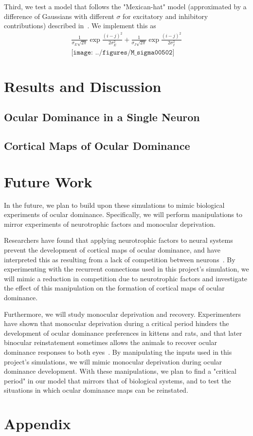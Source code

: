 \documentclass[pageno]{mat323paper}
\begin{document}
Third, we test a model that follows the "Mexican-hat" model (approximated by a difference of Gaussians with different $\sigma$ for excitatory and inhibitory contributions) described in~\cite{toyoizumi_equalization_2009}. We implement this as 
\begin{align}
\frac{1}{\sigma_E\sqrt{2\pi}}\exp{\frac{(i-j)^2}{2\sigma_E^2}}+\frac{1}{\sigma_I\sqrt{2\pi}}\exp{\frac{(i-j)^2}{2\sigma_I^2}}\\
\texttt{[image: ../figures/M\_sigma00502]}
\end{align}

\section{Results and Discussion}
\subsection{Ocular Dominance in a Single Neuron}
\subsection{Cortical Maps of Ocular Dominance}

\section{Future Work}
In the future, we plan to build upon these simulations to mimic biological experiments of ocular dominance. Specifically, we will perform manipulations to mirror experiments of neurotrophic factors and monocular deprivation.

Researchers have found that applying neurotrophic factors to neural systems prevent the development of cortical maps of ocular dominance, and have interpreted this as resulting from a lack of competition between neurons~\cite{harris_model_1997}. By experimenting with the recurrent connections used in this project's simulation, we will mimic a reduction in competition due to neurotrophic factors and investigate the effect of this manipulation on the formation of cortical maps of ocular dominance.

Furthermore, we will study monocular deprivation and recovery. Experimenters have shown that monocular deprivation during a critical period hinders the development of ocular dominance preferences in kittens and rats, and that later binocular reinstatement sometimes allows the animals to recover ocular dominance responses to both eyes~\cite{feldman_synaptic_2009}\cite{mitchell_recovery_1977}. By manipulating the inputs used in this project's simulations, we will mimic monocular deprivation during ocular dominance development. With these manipulations, we plan to find a "critical period" in our model that mirrors that of biological systems, and to test the situations in which ocular dominance maps can be reinstated.




\section{Appendix}\label{sec:Appendix}
\end{document}
